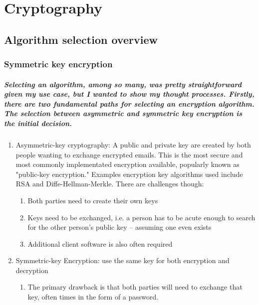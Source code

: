 
\chapter{Cryptography}

\section{Algorithm selection overview}

\subsection{Symmetric key encryption}
\paragraph{Selecting an algorithm, among so many, was pretty straightforward given my use case, but I wanted to show my thought processes. Firstly, there are two fundamental paths for selecting an encryption algorithm. The selection between \emph{asymmetric} and \emph{symmetric} key encryption is the initial decision.}

\begin{enumerate}
\item Asymmetric-key cryptography: A public and private key are created by both people wanting to exchange encrypted emails. This is the most secure and most commonly implementated encryption available, popularly known as "public-key encryption." Examples encryption key algorithms used include RSA and Diffe-Hellman-Merkle.
There are challenges though:\cite{Shirey}
\begin{enumerate}
\item Both parties need to create their own keys
\item Keys need to be exchanged, i.e. a person has to be acute enough to search for the other person's public key -- assuming one even exists
\item Additional client software is also often required
\end{enumerate}
\item Symmetric-key Encryption: use the same key for both encryption and decryption\cite[p. 155]{DelfsKnebl}
\begin{enumerate}
\item The primary drawback is that both parties will need to exchange that key, often times in the form of a password.
\end{enumerate}
\end{enumerate}

